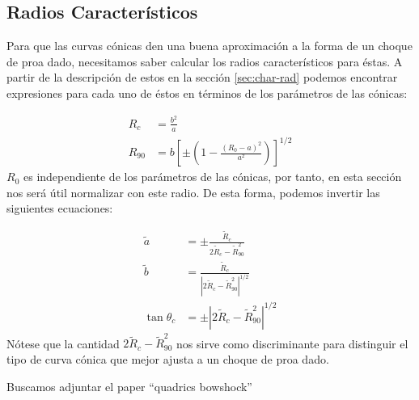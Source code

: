 \subsection{Radios Característicos}

Para que las curvas cónicas den una buena aproximación a la forma de un choque de proa dado, necesitamos saber
calcular los radios característicos para éstas. A partir de la descripción de estos en la sección
\ref{sec:char-rad} podemos encontrar expresiones para cada uno de éstos en términos de los parámetros de las
cónicas:

\begin{align}
  R_c &= \frac{b^2}{a} \\
  R_{90} &= b\left[\pm\left(1 - \frac{(R_0 - a)^2}{a^2}\right)\right]^{1/2}
\end{align}
$R_0$ es independiente de los parámetros de las cónicas, por tanto, en
esta sección nos será útil normalizar con este radio. De esta forma,
podemos invertir las siguientes ecuaciones:

\begin{align}
  \tilde{a} &= \pm\frac{\tilde{R}_c}{2\tilde{R}_c - \tilde{R}_{90}^2} \\
  \tilde{b} &= \frac{\tilde{R}_c}{\left|2\tilde{R}_c - \tilde{R}_{90}^2\right|^{1/2}}\\
  \tan\theta_c &= \pm\left|2\tilde{R}_c - \tilde{R}_{90}^2\right|^{1/2}
\end{align}
Nótese que la cantidad $2\tilde{R}_c - \tilde{R}_{90}^2$ nos sirve como discriminante para
distinguir el tipo de curva cónica que mejor ajusta a un choque de proa dado.

Buscamos adjuntar el paper ``quadrics bowshock''
